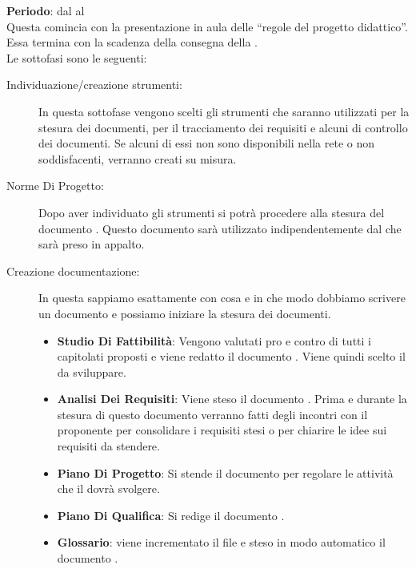 	\textbf{Periodo}: dal  al  \\
	Questa  comincia con la presentazione in aula delle “regole del progetto didattico”. Essa termina con la scadenza della consegna della .\\Le sottofasi sono le seguenti:
	\begin{description}
		\item[Individuazione/creazione strumenti:] In questa sottofase vengono scelti gli strumenti che saranno utilizzati per la stesura dei documenti, per il tracciamento dei requisiti e alcuni  di controllo dei documenti. Se alcuni di essi non sono disponibili nella rete o non soddisfacenti, verranno creati su misura.
		\item[Norme Di Progetto:] Dopo aver individuato gli strumenti si potrà procedere alla stesura del documento . Questo documento sarà utilizzato indipendentemente dal  che sarà preso in appalto.
		\item[Creazione documentazione:] In questa  sappiamo esattamente con cosa e in che modo dobbiamo scrivere un documento e possiamo iniziare la stesura dei documenti.
			\begin{itemize}
				\item \textbf{Studio Di Fattibilità}: Vengono valutati pro e contro di tutti i capitolati proposti e viene redatto il documento . Viene quindi scelto il  da sviluppare.
				\item \textbf{Analisi Dei Requisiti}: Viene steso il documento . Prima e durante la stesura di questo documento verranno fatti degli incontri con il proponente per consolidare i requisiti stesi o per chiarire le idee sui requisiti da stendere.
				\item \textbf{Piano Di Progetto}: Si stende il documento  per regolare le attività che il  dovrà svolgere.
				\item \textbf{Piano Di Qualifica}: Si redige il documento .
				\item \textbf{Glossario}: viene incrementato il file   e steso in modo automatico il documento .
			\end{itemize}
	\end{description}

